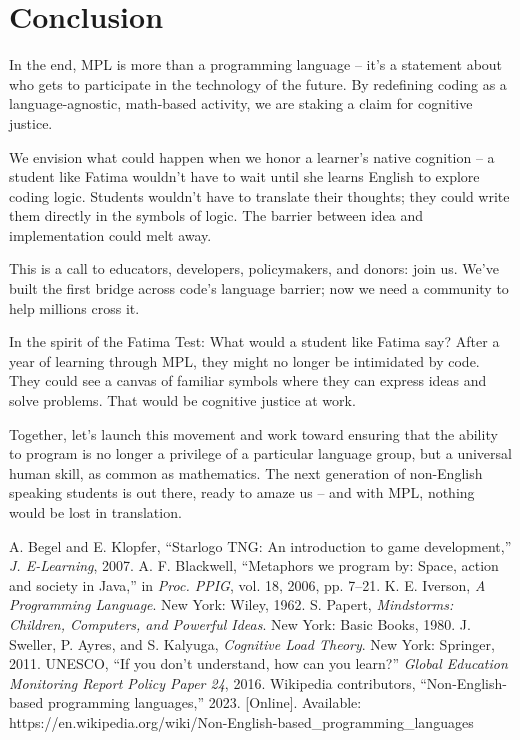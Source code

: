 \documentclass[10pt,conference]{IEEEtran}
\begin{document}
\section{Conclusion}

In the end, MPL is more than a programming language – it's a statement about who gets to participate in the technology of the future. By redefining coding as a language-agnostic, math-based activity, we are staking a claim for cognitive justice.

We envision what could happen when we honor a learner's native cognition – a student like Fatima wouldn't have to wait until she learns English to explore coding logic. Students wouldn't have to translate their thoughts; they could write them directly in the symbols of logic. The barrier between idea and implementation could melt away.

This is a call to educators, developers, policymakers, and donors: join us. We've built the first bridge across code's language barrier; now we need a community to help millions cross it.

In the spirit of the Fatima Test: What would a student like Fatima say? After a year of learning through MPL, they might no longer be intimidated by code. They could see a canvas of familiar symbols where they can express ideas and solve problems. That would be cognitive justice at work.

Together, let's launch this movement and work toward ensuring that the ability to program is no longer a privilege of a particular language group, but a universal human skill, as common as mathematics. The next generation of non-English speaking students is out there, ready to amaze us – and with MPL, nothing would be lost in translation.

\begin{thebibliography}{00}
 A. Begel and E. Klopfer, ``Starlogo TNG: An introduction to game development,'' \emph{J. E-Learning}, 2007.
 A. F. Blackwell, ``Metaphors we program by: Space, action and society in Java,'' in \emph{Proc. PPIG}, vol. 18, 2006, pp. 7--21.
 K. E. Iverson, \emph{A Programming Language}. New York: Wiley, 1962.
 S. Papert, \emph{Mindstorms: Children, Computers, and Powerful Ideas}. New York: Basic Books, 1980.
 J. Sweller, P. Ayres, and S. Kalyuga, \emph{Cognitive Load Theory}. New York: Springer, 2011.
 UNESCO, ``If you don't understand, how can you learn?'' \emph{Global Education Monitoring Report Policy Paper 24}, 2016.
 Wikipedia contributors, ``Non-English-based programming languages,'' 2023. [Online]. Available: https://en.wikipedia.org/wiki/Non-English-based\_programming\_languages
\end{thebibliography}
\end{document}

